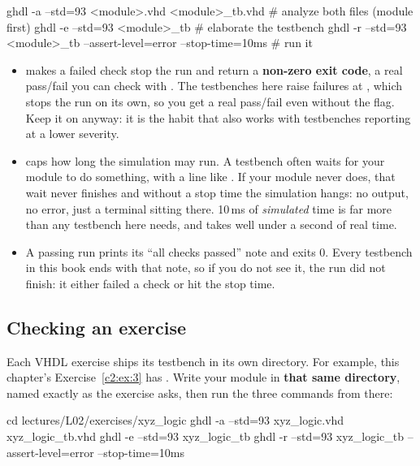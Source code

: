 \begin{shell}
ghdl -a --std=93 <module>.vhd <module>_tb.vhd  # analyze both files (module first)
ghdl -e --std=93 <module>_tb                   # elaborate the testbench
ghdl -r --std=93 <module>_tb --assert-level=error --stop-time=10ms   # run it
\end{shell}

\begin{itemize}
  \item {} makes a failed check stop the run and return a
    \textbf{non-zero exit code}, a real pass/fail you can check with . The testbenches
    here raise failures at , which stops the run on its own, so you get a
    real pass/fail even without the flag. Keep it on anyway: it is the habit that also works with
    testbenches reporting at a lower severity.
  \item {} caps how long the simulation may run. A testbench often waits for
    your module to do something, with a line like . If your module never
    does, that wait never finishes and without a stop time the simulation hangs: no output, no
    error, just a terminal sitting there. 10\,ms of \emph{simulated} time is far more than any
    testbench here needs, and takes well under a second of real time.
  \item A passing run prints its ``all checks passed'' note and exits 0. Every testbench in this
    book ends with that note, so if you do not see it, the run did not finish: it either failed a
    check or hit the stop time.
\end{itemize}

\subsection{Checking an exercise}
\label{c2:c4}
Each VHDL exercise ships its testbench in its own directory. For example, this chapter's
Exercise~\ref{c2:ex:3} has . Write your
module in \textbf{that same directory}, named exactly as the exercise asks, then run the three
commands from there:

\begin{shell}
cd lectures/L02/exercises/xyz_logic
ghdl -a --std=93 xyz_logic.vhd xyz_logic_tb.vhd
ghdl -e --std=93 xyz_logic_tb
ghdl -r --std=93 xyz_logic_tb --assert-level=error --stop-time=10ms
\end{shell}

